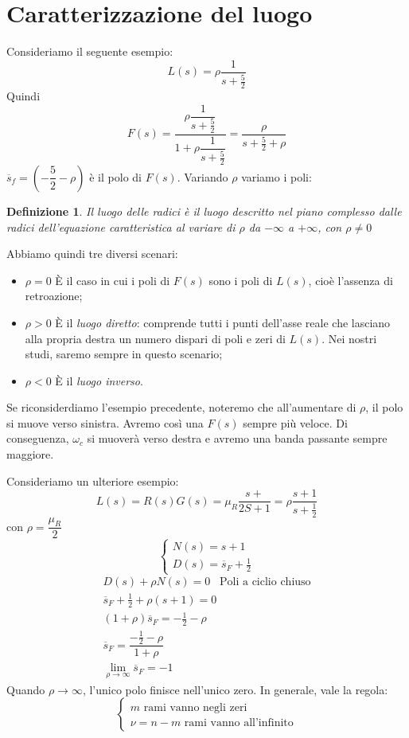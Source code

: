 \documentclass[a4paper]{report}
\newtheorem{definizione}{Definizione}
\begin{document}
\section{Caratterizzazione del luogo}
Consideriamo il seguente esempio:
\[
L(s) = \rho \dfrac{1}{s + \frac{5}{2}}
\]
Quindi
\[
F(s) = \dfrac{\rho \dfrac{1}{s + \frac{5}{2}}}{1 + \rho \dfrac{1}{s +
    \frac{5}{2}}} = \dfrac{\rho}{s + \frac{5}{2} + \rho}
\]
$\overline{s}_f = \left(- \dfrac{5}{2} - \rho \right)$ \`e il polo di $F(s)$.
Variando $\rho$ variamo i poli:
\begin{definizione}
  Il luogo delle radici \`e il luogo descritto nel piano complesso
  dalle radici dell'equazione caratteristica al variare di $\rho$ da
  $- \infty$ a $+ \infty$, con $\rho \neq 0$
\end{definizione}
Abbiamo quindi tre diversi scenari:
\begin{itemize}
\item $\rho = 0$ \`E il caso in cui i poli di $F(s)$ sono i poli di
  $L(s)$, cio\`e l'assenza di retroazione;
\item $\rho > 0$ \`E il {\em luogo diretto}:
  comprende tutti i punti dell'asse reale che lasciano alla propria
  destra un numero dispari di poli e zeri di $L(s)$. Nei nostri studi,
  saremo sempre in questo scenario;
\item $\rho < 0$ \`E il {\em luogo inverso}.
\end{itemize}
Se riconsiderdiamo l'esempio precedente, noteremo che all'aumentare di
$\rho$, il polo si muove verso sinistra. Avremo cos\`i una $F(s)$
sempre pi\`u veloce. Di conseguenza, $\omega_c$ si muover\`a verso
destra e avremo una banda passante sempre maggiore.

Consideriamo un ulteriore esempio:
\[
L(s) = R(s)G(s) = \mu_R \dfrac{s + }{2S + 1} = \rho \dfrac{s + 1}{s + \frac{1}{2}}
\]
con $\rho = \dfrac{\mu_R}{2}$
\[
\left\{
\begin{array}{l}
  N(s) = s + 1\\
  D(s) = \overline{s}_F + \frac{1}{2}
\end{array}
\right .
\]
\[
\begin{array}{l}
  D(s) + \rho N(s) = 0 \;\;\;\textrm{Poli a ciclio chiuso}\\
  \overline{s}_F + \frac{1}{2} + \rho (s + 1) = 0\\
  (1 + \rho) \overline{s}_F = - \frac{1}{2} - \rho\\
  \overline{s}_F = \dfrac{- \frac{1}{2} - \rho}{1 + \rho}\\
  \lim_{\rho \to \infty} \overline{s}_F = -1
\end{array}
\]
Quando $\rho \to \infty$, l'unico polo finisce nell'unico zero. In
generale, vale la regola:
\[
\left\{
\begin{array}{l}
  m \textrm{ rami vanno negli zeri}\\
  \nu = n - m \textrm{ rami vanno all'infinito}
\end{array}
\right .
\]
\end{document}
